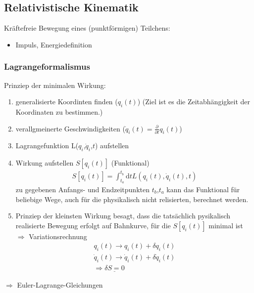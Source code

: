 \documentclass[a4paper]{article}
\begin{document}
\subsection{Relativistische Kinematik}
Kräftefreie Bewegung eines (punktförmigen) Teilchens:
\begin{itemize}
  \item Impuls, Energiedefinition
\end{itemize}

\subsubsection{Lagrangeformalismus}
Prinziep der minimalen Wirkung:
\begin{enumerate}
  \item generalisierte Koordinten finden ($q_i(t)$) (Ziel ist es die
  Zeitabhängigkeit der Koordinaten zu bestimmen.)
  \item verallgmeinerte Geschwindigkeiten
  ($\dot{q}_i(t)=\frac{\partial}{\partial t}q_i(t)$)
  \item Lagrangefunktion L($q_i$,$\dot{q}_i$,$t$) aufstellen
  \item Wirkung aufstellen $S[q_i(t)]$ (Funktional)
  \begin{align}
  S[q_i(t)]=\int_{t_a}^{t_b} \mathrm{d}t L(q_i(t),\dot{q}_i(t),t)
  \end{align}
  zu gegebenen Anfangs- und Endzeitpunkten $t_b$,$t_a$ kann das Funktional für
  beliebige Wege, auch für die physikalisch nicht relisierten, berechnet werden.
  \item Prinziep der kleinsten Wirkung besagt, dass die tatsächlich pysikalisch 
  realisierte Bewegung erfolgt auf Bahnkurve, für die $S[q_i(t)]$ minimal ist
  $\Rightarrow$ Variationsrechnung 
  \begin{align}
  q_i(t)\rightarrow q_i(t)+\delta q_i(t)\\
  \dot{q}_i(t)\rightarrow \dot{q}_i(t)+\delta \dot{q}_i(t)\\
  \Rightarrow \underline{\delta S = 0}
  \end{align} 
\end{enumerate}
$\Rightarrow$ Euler-Lagrange-Gleichungen
\end{document}
